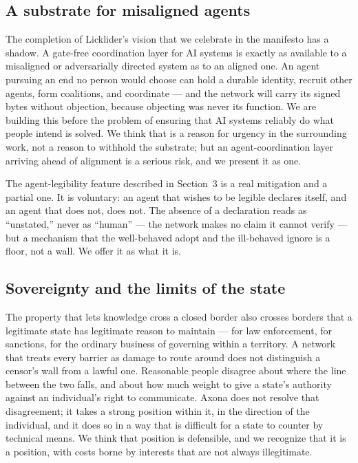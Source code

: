 \documentclass[nobib,justified]{tufte-handout}
\begin{document}
\subsection{A substrate for misaligned agents}

The completion of Licklider's vision that we celebrate in the manifesto has a
shadow. A gate-free coordination layer for AI systems is exactly as available to
a misaligned or adversarially directed system as to an aligned one. An agent
pursuing an end no person would choose can hold a durable identity, recruit other
agents, form coalitions, and coordinate --- and the network will carry its signed
bytes without objection, because objecting was never its function. We are building
this before the problem of ensuring that AI systems reliably do what people intend
is solved. We think that is a reason for urgency in the surrounding work, not a
reason to withhold the substrate; but an agent-coordination layer arriving ahead of alignment is a serious risk, and we present it as one.

The agent-legibility feature described in Section~3 is a real mitigation and a
partial one. It is voluntary: an agent that wishes to be legible declares itself,
and an agent that does not, does not. The absence of a declaration reads as
``unstated,'' never as ``human'' --- the network makes no claim it cannot verify
--- but a mechanism that the well-behaved adopt and the ill-behaved ignore is a
floor, not a wall. We offer it as what it is.

\subsection{Sovereignty and the limits of the state}

The property that lets knowledge cross a closed border also crosses borders that
a legitimate state has legitimate reason to maintain --- for law enforcement, for
sanctions, for the ordinary business of governing within a territory. A network
that treats every barrier as damage to route around does not distinguish a
censor's wall from a lawful one. Reasonable people disagree about where the line
between the two falls, and about how much weight to give a state's authority
against an individual's right to communicate. Axona does not resolve that
disagreement; it takes a strong position within it, in the direction of the
individual, and it does so in a way that is difficult for a state to counter by
technical means. We think that position is defensible, and we recognize that it
is a position, with costs borne by interests that are not always illegitimate.
\end{document}
